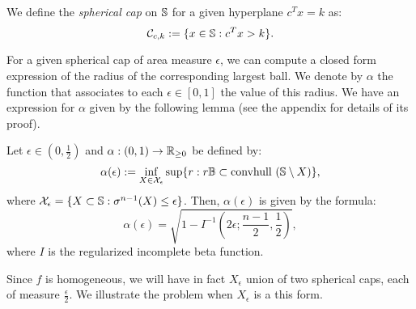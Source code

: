 \begin{definition}
We define the \emph{spherical cap} on $\mathbb{S}$ for a given hyperplane $c^Tx = k$ as:
\begin{equation*}\mathcal{C}_{c,k} := \{x \in \mathbb{S} : c^Tx >k\}.
\end{equation*}
\end{definition}

\begin{center}
\end{center}

For a given spherical cap of area measure $\epsilon$, we can compute a closed form expression of the radius of the corresponding largest ball. We denote by $\alpha$ the function that associates to each $\epsilon \in [0,1]$ the value of this radius. We have an expression for $\alpha$ given by the following lemma (see the appendix for details of its proof).

\begin{lemma}\label{lemma:eps}
Let $\epsilon \in (0, \frac{1}{2})$ and $\alpha: (0,1) \to \mathbb{R}_{\geq 0}$ be defined by:
\begin{equation}\label{eqn:ballinc}
\alpha(\epsilon) := \inf_{X \in \mathcal{X}_\epsilon} \sup\{r: r\mathbb{B} \subset \mbox{convhull }(\mathbb{S} \setminus X)\},
\end{equation}
where $\mathcal{X}_{\epsilon} = \{X \subset \mathbb{S}: \sigma^{n-1}(X) \leq \epsilon\}$. Then, $\alpha(\epsilon)$ is given by the formula:
\begin{equation}\label{eqn:alphaEpsilon}
\alpha(\epsilon) = \sqrt{1- I^{-1}\left(2\epsilon; \frac{n-1}{2}, \frac{1}{2}\right)}, \end{equation}
where $I$ is the regularized incomplete beta function.
\end{lemma}

Since $f$ is homogeneous, we will have in fact $X_{\epsilon}$ union of two spherical caps, each of measure $\frac{\epsilon}{2}$. We illustrate the problem when $X_{\epsilon}$ is a this form.

